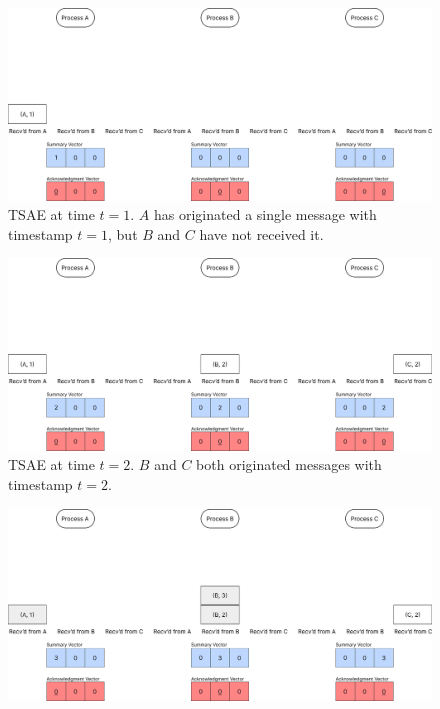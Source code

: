 \documentclass[]             %
{NASA}                       %
\theoremstyle{definition}
\begin{document}
\begin{landscape}
  \begin{figure}%
  \end{figure}
  \begin{figure}[h]
    \centering
    \includegraphics[width=1.4\textwidth]{images/tsae/TSAE1.png}
    \caption{TSAE at time $t=1$. $A$ has originated a single message with timestamp $t=1$, but $B$ and $C$ have not received it.}
    \label{fig:tsae1}
  \end{figure}
  \begin{figure}[h]
    \centering
    \includegraphics[width=1.4\textwidth]{images/tsae/TSAE2.png}
    \caption{TSAE at time $t=2$. $B$ and $C$ both originated messages with timestamp $t=2$.}
    \label{fig:tsae2}
  \end{figure}
  \begin{figure}[h]
    \centering
    \includegraphics[width=1.4\textwidth]{images/tsae/TSAE3.png}

\end{figure}
\end{landscape}
\end{document}
